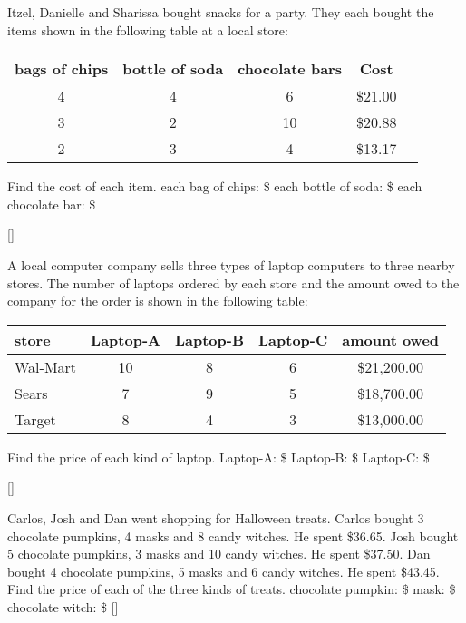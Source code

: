 \documentclass[12pt,letterpaper]{memoir}
\begin{document}
%
%
\myWideProblemWithContent
{
    Itzel, Danielle and Sharissa bought snacks for a party. 
    They each bought the items shown in the
    following table at a local  store:
    \begin{center}
        \begin{tabular}{ccccc}
            bags of chips & bottle of soda & chocolate bars & Cost \\
            \toprule
            4 & 4 & 6  & \$21.00  \\
            3 & 2 & 10 & \$20.88  \\
            2 & 3 &  4 & \$13.17  \\
        \end{tabular}
    \end{center}
    Find the cost of each item.
    \mySystemTable
    \small
    each bag of chips: \$
    \hfill 
    each bottle of soda: \$
    \hfill 
    each chocolate bar: \$
    }[\small]


%
%
\myWideProblemWithContent
{
    A local computer company sells three types of laptop computers 
    to three nearby stores. 
    The number of laptops ordered by each store and the amount owed to the
    company for the order is shown in the following table:
    \begin{center}
        \begin{tabular}{lcccc}
            store & Laptop-A & Laptop-B & Laptop-C & amount owed \\
            \toprule
            Wal-Mart & 10 & 8 & 6 & \$21,200.00  \\
            Sears    & 7  & 9 & 5 & \$18,700.00  \\
            Target   & 8  & 4 & 3 & \$13,000.00  \\
        \end{tabular}
    \end{center}
    Find the price of each kind of laptop.
    \mySystemTable
    \small
    Laptop-A: \$
    \hfil 
    Laptop-B: \$
    \hfil 
    Laptop-C: \$
    }[\small]


%
%
\myWideProblemWithContent
{
    Carlos, Josh and Dan went shopping for Halloween treats. 
    Carlos bought 3 chocolate pumpkins, 4 masks and 8 candy witches. 
    He spent \$36.65. 
    Josh bought 5 chocolate pumpkins, 3 masks and 10 candy witches. 
    He spent \$37.50. 
    Dan bought 4 chocolate pumpkins, 5 masks and 6 candy witches. 
    He spent \$43.45. 
    Find the price of each of the three kinds of treats.
    \mySystemTable
    \small
    chocolate pumpkin: \$
    \hfill 
    mask: \$
    \hfill 
    chocolate witch: \$
    }[\small]
\end{document}
